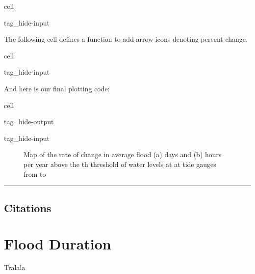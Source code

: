 \documentclass[letterpaper,10pt,english]{jupyterBook}
\begin{document}
\begin{sphinxuseclass}{cell}
\begin{sphinxuseclass}{tag_hide-input}
\end{sphinxuseclass}
\end{sphinxuseclass}
\sphinxAtStartPar
The following cell defines a function to add arrow icons denoting percent change.

\begin{sphinxuseclass}{cell}
\begin{sphinxuseclass}{tag_hide-input}
\end{sphinxuseclass}
\end{sphinxuseclass}
\sphinxAtStartPar
And here is our final plotting code:

\begin{sphinxuseclass}{cell}
\begin{sphinxuseclass}{tag_hide-output}
\begin{sphinxuseclass}{tag_hide-input}
\end{sphinxuseclass}
\end{sphinxuseclass}
\end{sphinxuseclass}
\begin{figure}[htbp]
\centering
\capstart

\noindent{}
\caption{Map of the rate of change in average flood (a) days and (b) hours per year above the th threshold of water levels at at  tide gauges from  to }\label{\detokenize{notebooks/FloodFrequency:mag-fig}}\end{figure}


\bigskip\hrule\bigskip



\chapter{Citations}
\label{\detokenize{notebooks/FloodFrequency:citations}}
\sphinxstepscope


\part{Flood Duration}
\label{\detokenize{notebooks/FloodDuration:flood-duration}}\label{\detokenize{notebooks/FloodDuration::doc}}
\sphinxAtStartPar
Tralala
\end{document}
